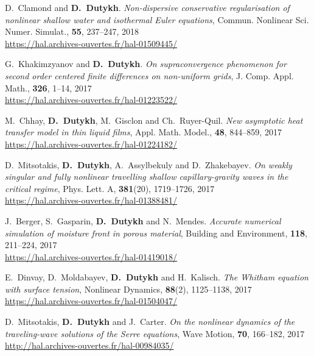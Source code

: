 \begin{etaremune}
  \item D.~Clamond and \textbf{D.~Dutykh}. \textit{Non-dispersive conservative regularisation of nonlinear shallow water and isothermal Euler equations}, Commun. Nonlinear Sci. Numer. Simulat., \textbf{55}, 237--247, 2018 \\ %
  \url{https://hal.archives-ouvertes.fr/hal-01509445/}
  
  
  \item G.~Khakimzyanov and \textbf{D.~Dutykh}. \textit{On supraconvergence phenomenon for second order centered finite differences on non-uniform grids}, J. Comp. Appl. Math., \textbf{326}, 1--14, 2017 \\ %
  \url{https://hal.archives-ouvertes.fr/hal-01223522/}

  \item M.~Chhay, \textbf{D.~Dutykh}, M.~Gisclon and Ch.~Ruyer-Quil. \textit{New asymptotic heat transfer model in thin liquid films}, Appl. Math. Model., \textbf{48}, 844--859, 2017 \\ %
  \url{https://hal.archives-ouvertes.fr/hal-01224182/}
  
  \item D.~Mitsotakis, \textbf{D.~Dutykh}, A.~Assylbekuly and D.~Zhakebayev. \textit{On weakly singular and fully nonlinear travelling shallow capillary-gravity waves in the critical regime}, Phys. Lett. A, \textbf{381}(20), 1719--1726, 2017 \\ %
  \url{https://hal.archives-ouvertes.fr/hal-01388481/}
  
  \item J.~Berger, S.~Gasparin, \textbf{D.~Dutykh} and N.~Mendes. \textit{Accurate numerical simulation of moisture front in porous material}, Building and Environment, \textbf{118}, 211--224, 2017 \\ %
  \url{https://hal.archives-ouvertes.fr/hal-01419018/}
  
  \item E.~Dinvay, D.~Moldabayev, \textbf{D.~Dutykh} and H.~Kalisch. \textit{The Whitham equation with surface tension}, Nonlinear Dynamics, \textbf{88}(2), 1125--1138, 2017 \\ %
  \url{https://hal.archives-ouvertes.fr/hal-01504047/}

  \item D.~Mitsotakis, \textbf{D.~Dutykh} and J.~Carter. \textit{On the nonlinear dynamics of the traveling-wave solutions of the Serre equations}, Wave Motion, \textbf{70}, 166--182, 2017 \\ %
  \url{http://hal.archives-ouvertes.fr/hal-00984035/}


\end{etaremune}
